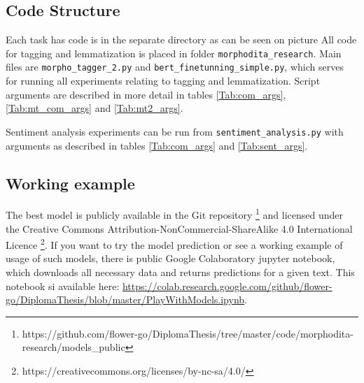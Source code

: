 \subsection{Code Structure}
Each task has code is in the separate directory as can be seen on picture %
All code for tagging and lemmatization is placed in folder \texttt{morphodita\_research}. Main files are \texttt{morpho\_tagger\_2.py} and \texttt{bert\_finetunning\_simple.py}, which serves for running all experiments relating to tagging and lemmatization. Script arguments are described in more detail in tables \ref{Tab:com_args}, \ref{Tab:mt_com_args} and \ref{Tab:mt2_args}.
\par
Sentiment analysis experiments can be run from \texttt{sentiment\_analysis.py} with arguments as described in tables \ref{Tab:com_args} and \ref{Tab:sent_args}.

\subsection{Working example}
The best model is publicly available in the Git repository \footnote{https://github.com/flower-go/DiplomaThesis/tree/master/code/morphodita-research/models\_public} %
 and licensed under the Creative Commons Attribution-NonCommercial-ShareAlike 4.0 International Licence \footnote{https://creativecommons.org/licenses/by-nc-sa/4.0/}. If you want to try the model prediction or see a working example of usage of such models, there is public Google Colaboratory \citep{colab} jupyter notebook, which downloads all necessary data and returns predictions for a given text. This notebook si available here: \url{https://colab.research.google.com/github/flower-go/DiplomaThesis/blob/master/PlayWithModels.ipynb}. 



